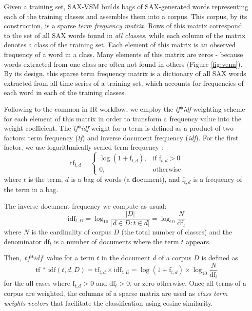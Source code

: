Given a training set, SAX-VSM builds bags of SAX-generated words representing 
each of the training classes and assembles them into a corpus. 
This corpus, by its construction, is a sparse \textit{term frequency matrix}. 
Rows of this matrix correspond to the set of all SAX words found in 
\textit{all classes}, while each column of the matrix denotes a class of the 
training set. Each element of this matrix is an observed frequency of a word
in a class. 
Many elements of this matrix are zeros - because words extracted from one class 
are often not found in others (Figure \ref{fig:venn}). 
By its design, this sparse 
term frequency matrix is a dictionary of all SAX words extracted from all time 
series of a training set, which accounts for frequencies of each word in each of 
the training classes.

Following to the common in IR workflow, we employ the \textit{tf$\ast$idf} weighting 
scheme for each element of this matrix in order to transform a frequency value into
the weight coefficient. 
The \textit{tf$\ast$idf} weight for a term is defined as a 
product of two factors: term frequency (\textit{tf}) and inverse document 
frequency (\textit{idf}). 
For the first factor, we use logarithmically scaled term frequency \cite{citeulike:4469058}:
\begin{equation}
 \mbox{tf}_{t, d} =  \begin{cases} \log(1 + \mbox{f}_{t,d}), &\mbox{if f}_{t,d}>0  \\
0, & \mbox{otherwise} \end{cases}
\end{equation} 
where $t$ is the term, $d$ is a bag of words (a \textbf{d}ocument), and $\mbox{f}_{t,d}$ 
is a frequency of the term in a bag.

The inverse document frequency we compute as usual:
\begin{equation}
 \mbox{idf}_{t, D} =  \log_{10}\frac{|D|}{|d \in D : t \in d|} = \log_{10}\frac{N}{\mbox{df}_{t}}
 \label{formula:idf}
\end{equation} 
where $N$ is the cardinality of corpus $D$ (the total number of classes) and the 
denominator $\mbox{df}_{t}$ is a number of documents where the term $t$ appears.

Then, $\textit{tf$\ast$idf}$ value for a term $t$ in the document $d$ of a corpus $D$ is defined as 
\begin{equation}
 \mbox{tf * idf}(t, d, D) =  \mbox{tf}_{t, d} \times \mbox{idf}_{t, D} = \log(1 + \mbox{f}_{t,d})
\times \log_{10}\frac{N}{\mbox{df}_{t}}
 \label{formula:tfidf}
\end{equation} 
for the all cases where $\mbox{f}_{t,d}>0$ and $\mbox{df}_{t}>0$, or zero otherwise.
Once all terms of a corpus are weighted, the columns of a sparse matrix are used 
as \textit{class term weights vectors} that facilitate the classification using cosine similarity. 

